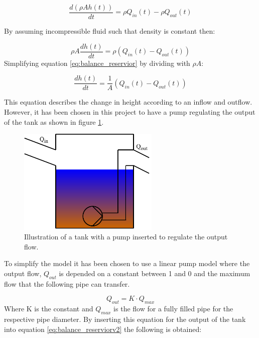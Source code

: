 \begin{equation}
		\frac{d(\rho Ah(t))}{dt}=\rho Q_{in}(t)-\rho Q_{out}(t)
\end{equation}

By assuming incompressible fluid such that density is constant then:

\begin{equation}\label{eq:balance_reservior}
	\rho A\frac{dh(t)}{dt}=\rho \left(Q_{in}(t)-Q_{out}(t)\right)
\end{equation}
Simplifying equation \ref{eq:balance_reservior} by dividing with $\rho A$:

\begin{equation}\label{eq:balance_reserviorv2}
	\frac{dh(t)}{dt}=\frac{1}{A} \left(Q_{in}(t)-Q_{out}(t)\right)
\end{equation}

This equation describes the change in height according to an inflow and outflow. However, it has been chosen in this project to have a pump regulating the output of the tank as shown in figure \ref{fig:reservior_with_pump}.

\begin{figure}[H]
	\centering
	\includegraphics[width=0.60\textwidth]{report/modeling/pictures/reservior_with_pump}
	\caption{Illustration of a tank with a pump inserted to regulate the output flow.}
	\label{fig:reservior_with_pump}
\end{figure}

To simplify the model it has been chosen to use a linear pump model where the output flow, $Q_{out}$ is depended on a constant between 1 and 0 and the maximum flow that the following pipe can transfer.

\begin{equation}
	Q_{out} = K \cdot Q_{max}
\end{equation}
Where K is the constant and $Q_{max}$ is the flow for a fully filled pipe for the respective pipe diameter. By inserting this equation for the output of the tank into equation \ref{eq:balance_reserviorv2} the following is obtained:

